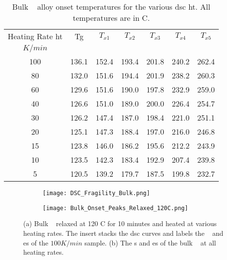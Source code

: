 \documentclass[a4paper,12pt,oneside]{article}%
\begin{document}
\begin{table}[h]
	\centering
	\begin{tabular}{ c c c c c c c }
		\toprule
		Heating Rate \acrshort{ht} & \acrshort{Tg} & $T_{x1}$ & $T_{x2}$ & $T_{x3}$ & $T_{x4}$ & $T_{x5}$ \\ 
		$K/min$ & & & & & & \\
		\midrule
		100 & 136.1 & 152.4 & 193.4 & 201.8 & 240.2 & 262.4 \\
		80  & 132.0 & 151.6 & 194.4 & 201.9 & 238.2 & 260.3 \\
		60  & 129.6 & 151.6 & 190.0 & 197.8 & 232.9 & 259.0 \\
		40  & 126.6 & 151.0 & 189.0 & 200.0 & 226.4 & 254.7 \\
		30  & 126.2 & 147.4 & 187.0 & 198.4 & 221.0 & 251.1 \\
		20  & 125.1 & 147.3 & 188.4 & 197.0 & 216.0 & 246.8 \\
		15  & 123.8 & 146.0 & 186.2 & 195.6 & 212.2 & 243.9 \\
		10  & 123.5 & 142.3 & 183.4 & 192.9 & 207.4 & 239.8 \\
		5   & 120.5 & 139.2 & 179.7 & 187.5 & 199.8 & 232.7 \\ 
		\bottomrule
	\end{tabular}
	\caption{Bulk \MgZnCa~ alloy onset temperatures for the various \acrshort{dsc}  \acrshort{ht}. All temperatures are in \degree C.}
	\label{tab:BulkOnsets}
\end{table}

\begin{figure}[b]
	\centering
	\begin{subfigure}[htbp]{0.495\textwidth}
		\texttt{[image: DSC\_Fragility\_Bulk.png]}
		\caption{}
		\label{fig:DSC_vHeatingRate_Bulk}
	\end{subfigure}
	\begin{subfigure}[htbp]{0.495\textwidth}
		\texttt{[image: Bulk\_Onset\_Peaks\_Relaxed\_120C.png]}
		\caption{}
		\label{fig:DSC_Onsets_Bulk}
	\end{subfigure}
	\caption{(a) Bulk \MgZnCa~ relaxed at 120 \degree C for 10 minutes and heated at various heating rates. The insert stacks the \gls{dsc} curves and labels the \Tg~ and \Tx es of the $100 K/min$ sample. (b) The \Tg s and \Tx es of the bulk \MgZnCa~ at all heating rates. }%
	\label{fig:DSC_Bulk}
\end{figure}
\end{document}
